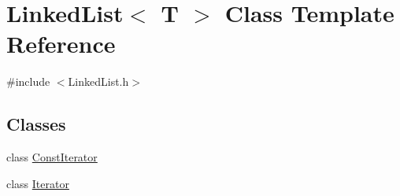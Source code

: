 \hypertarget{class_linked_list}{
\section{LinkedList$<$ T $>$ Class Template Reference}
\label{class_linked_list}
}


{\ttfamily \#include $<$LinkedList.h$>$}

\subsection*{Classes}
\begin{DoxyCompactItemize}
\item 
class \hyperlink{class_linked_list_1_1_const_iterator}{ConstIterator}
\item 
class \hyperlink{class_linked_list_1_1_iterator}{Iterator}
\end{DoxyCompactItemize}
